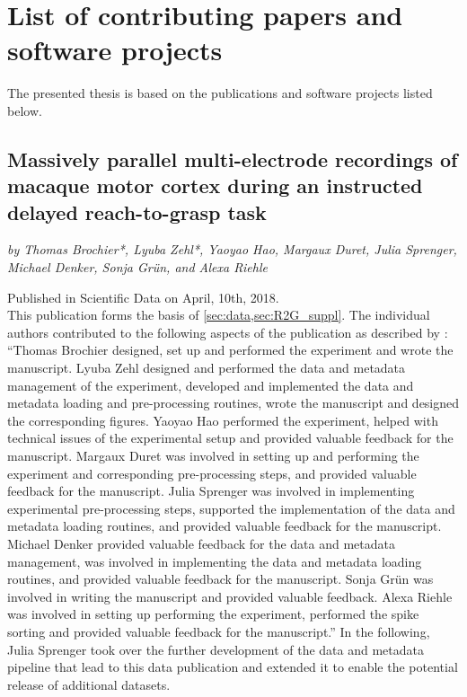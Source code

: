 \hypersetup{pageanchor=false} %

\cleardoublepage
\pagestyle{plain}
\section*{List of contributing papers and software projects}
\label{sec:ListofPapers}


The presented thesis is based on the publications and software projects listed below.

\vspace{2cm}

\subsection*{Massively parallel multi-electrode recordings of macaque motor cortex during an instructed delayed reach-to-grasp task}
\textit{by Thomas Brochier*, Lyuba Zehl*, Yaoyao Hao, Margaux Duret, Julia Sprenger, Michael Denker, Sonja Grün, and Alexa Riehle}

Published in Scientific Data on April, 10th, 2018. \citep{Brochier_2018}\\

This publication forms the basis of \cref{sec:data,sec:R2G_suppl}. The individual authors contributed to the following aspects of the publication as described by \citet{Zehl_2018}: ``Thomas Brochier designed, set up and performed the experiment and wrote the manuscript. Lyuba Zehl designed and performed the data and metadata management of the experiment, developed and implemented the data and metadata loading and pre-processing routines, wrote the manuscript and designed the corresponding figures. Yaoyao Hao performed the experiment, helped with technical issues of the experimental setup and provided valuable feedback for the manuscript. Margaux Duret was involved in setting up and performing the experiment and corresponding pre-processing steps, and provided valuable feedback for the manuscript. Julia Sprenger was involved in implementing experimental pre-processing steps, supported the implementation of the data and metadata loading routines, and provided valuable feedback for the manuscript. Michael Denker provided valuable feedback for the data and metadata management, was involved in implementing the data and metadata loading routines, and provided valuable feedback for the manuscript. Sonja Grün was involved in writing the manuscript and provided valuable feedback. Alexa Riehle was involved in setting up performing the experiment, performed the spike sorting and provided valuable feedback for the manuscript.'' In the following, Julia Sprenger took over the further development of the data and metadata pipeline that lead to this data publication and extended it to enable the potential release of additional datasets.\\

